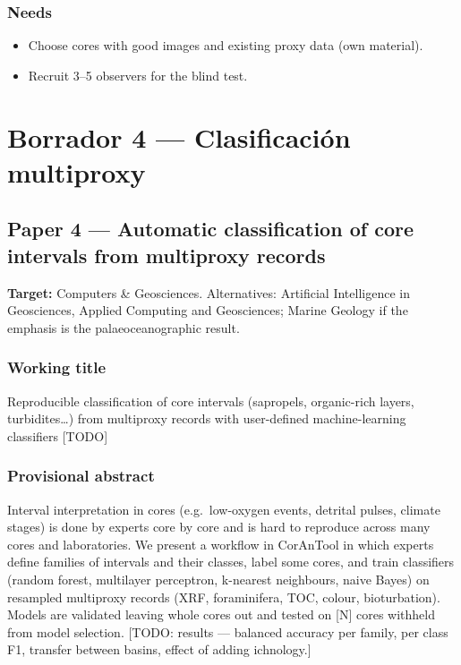 \documentclass[
  10pt,
]{article}
\providecommand{\tightlist}{%
  \setlength{\itemsep}{0pt}\setlength{\parskip}{0pt}}
\begin{document}
\hypertarget{needs-1}{%
\subsubsection{Needs}\label{needs-1}}

\begin{itemize}
\tightlist
\item[$\square$]
  Choose cores with good images and existing proxy data (own material).
\item[$\square$]
  Recruit 3--5 observers for the blind test.
\end{itemize}

\newpage

\hypertarget{borrador-4-clasificaciuxf3n-multiproxy}{%
\section{Borrador 4 --- Clasificación
multiproxy}\label{borrador-4-clasificaciuxf3n-multiproxy}}

\hypertarget{paper-4-automatic-classification-of-core-intervals-from-multiproxy-records}{%
\subsection{Paper 4 --- Automatic classification of core intervals from
multiproxy
records}\label{paper-4-automatic-classification-of-core-intervals-from-multiproxy-records}}

\textbf{Target:} Computers \& Geosciences. Alternatives: Artificial
Intelligence in Geosciences, Applied Computing and Geosciences; Marine
Geology if the emphasis is the palaeoceanographic result.

\hypertarget{working-title-2}{%
\subsubsection{Working title}\label{working-title-2}}

Reproducible classification of core intervals (sapropels, organic-rich
layers, turbidites\ldots) from multiproxy records with user-defined
machine-learning classifiers {[}TODO{]}

\hypertarget{provisional-abstract-1}{%
\subsubsection{Provisional abstract}\label{provisional-abstract-1}}

Interval interpretation in cores (e.g.~low-oxygen events, detrital
pulses, climate stages) is done by experts core by core and is hard to
reproduce across many cores and laboratories. We present a workflow in
CorAnTool in which experts define families of intervals and their
classes, label some cores, and train classifiers (random forest,
multilayer perceptron, k-nearest neighbours, naive Bayes) on resampled
multiproxy records (XRF, foraminifera, TOC, colour, bioturbation).
Models are validated leaving whole cores out and tested on {[}N{]} cores
withheld from model selection. {[}TODO: results --- balanced accuracy
per family, per class F1, transfer between basins, effect of adding
ichnology.{]}
\end{document}
